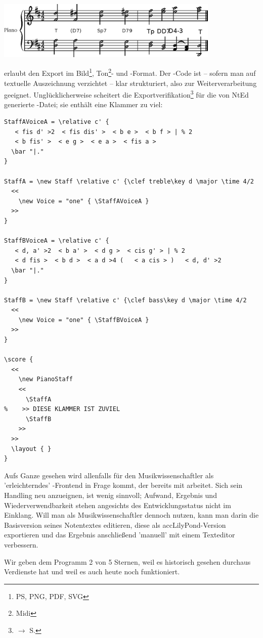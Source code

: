 \begin{center}
\includegraphics[width=0.8\textwidth]{frontends/nted/candenca2-ntd}
\end{center}

 erlaubt den Export im Bild\footnote{PS, PNG, PDF, SVG},
Ton\footnote{Midi}- und -Format. Der -Code ist --
sofern man auf textuelle Auszeichnung verzichtet -- klar strukturiert, also zur
Weiterverarbeitung geeignet. Unglücklicherweise scheitert die
Exportverifikation\footnote{$\rightarrow$ S.\pageref{ExportVerifikation}} für
die von NtEd generierte -Datei; sie enthält eine Klammer zu viel:

\begin{verbatim}
StaffAVoiceA = \relative c' {
   < fis d' >2  < fis dis' >  < b e >  < b f > | % 2
   < b fis' >  < e g >  < e a >  < fis a > 
  \bar "|."
}

StaffA = \new Staff \relative c' {\clef treble\key d \major \time 4/2
  <<
    \new Voice = "one" { \StaffAVoiceA } 
  >>
}

StaffBVoiceA = \relative c' {
   < d, a' >2  < b a' >  < d g >  < cis g' > | % 2
   < d fis >  < b d >  < a d >4 (   < a cis > )   < d, d' >2 
  \bar "|."
}

StaffB = \new Staff \relative c' {\clef bass\key d \major \time 4/2
  <<
    \new Voice = "one" { \StaffBVoiceA } 
  >>
}

\score {
  <<
    \new PianoStaff 
    <<
      \StaffA
%    >> DIESE KLAMMER IST ZUVIEL
      \StaffB
    >>
  >>
  \layout { }
}
\end{verbatim}

Aufs Ganze gesehen wird  allenfalls für den Musikwissenschaftler als
'erleichterndes' -Frontend in Frage kommt, der bereits mit
 arbeitet. Sich sein Handling neu anzueignen, ist wenig sinnvoll;
Aufwand, Ergebnis und Wiederverwendbarkeit stehen angesichts des
Entwicklungsstatus nicht im Einklang. Will man als Musikwissenschaftler
 dennoch nutzen, kann man darin die Basisversion seines Notentextes
editieren, diese als acc{LilyPond}-Version exportieren und das Ergebnis
anschließend 'manuell' mit einem Texteditor verbessern.

Wir geben dem Programm 2 von 5 Sternen, weil es historisch gesehen durchaus
Verdienste hat und weil es auch heute noch funktioniert.


%
